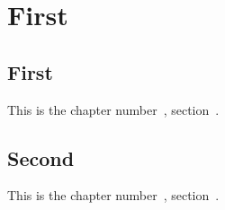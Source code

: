 \documentclass{report}
\begin{document}
\chapter{First} \label{chap:first}

\section{First} \label{sec:first}

This is the chapter number~\thechapter, section~\thesection.


\section{Second} \label{sec:second}

This is the chapter number~\thechapter, section~\thesection.
\end{document}
